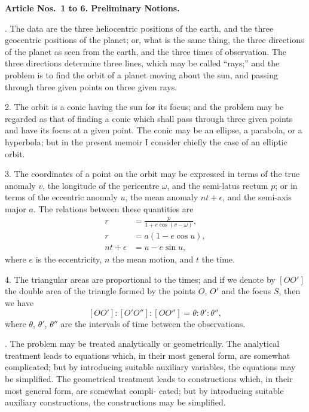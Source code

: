 \documentclass[11pt,a4paper]{article}
\theoremstyle{definition}
\begin{document}
\newpage
\noindent
\textbf{Article Nos.~1 to 6. Preliminary Notions.}

\smallskip

. The data are the three heliocentric positions of the earth, and the three geocentric
positions of the planet; or, what is the same thing, the three directions of the planet as
seen from the earth, and the three times of observation. The three directions determine
three lines, which may be called ``rays;'' and the problem is to find the orbit of a planet
moving about the sun, and passing through three given points on three given rays.

2. The orbit is a conic having the sun for its focus; and the problem may be regarded
as that of finding a conic which shall pass through three given points and have its focus
at a given point. The conic may be an ellipse, a parabola, or a hyperbola; but in the
present memoir I consider chiefly the case of an elliptic orbit.

3. The coordinates of a point on the orbit may be expressed in terms of the true
anomaly $v$, the longitude of the pericentre $\omega$, and the semi-latus rectum $p$; or in terms
of the eccentric anomaly $u$, the mean anomaly $nt+\epsilon$, and the semi-axis major $a$. The
relations between these quantities are
\begin{align*}
r &= \frac{p}{1+e\cos(v-\omega)}, \\
r &= a(1-e\cos u), \\
nt + \epsilon &= u - e\sin u,
\end{align*}
where $e$ is the eccentricity, $n$ the mean motion, and $t$ the time.

4. The triangular areas are proportional to the times; and if we denote by $[OO']$ the
double area of the triangle formed by the points $O$, $O'$ and the focus $S$, then we have
\[
[OO'] : [O'O''] : [OO''] = \theta : \theta' : \theta'',
\]
where $\theta$, $\theta'$, $\theta''$ are the intervals of time between the observations.

\newpage
{}. The problem may be treated analytically or geometrically. The analytical treatment
leads to equations which, in their most general form, are somewhat complicated; but by
introducing suitable auxiliary variables, the equations may be simplified. The geometrical
treatment leads to constructions which, in their most general form, are somewhat compli-
cated; but by introducing suitable auxiliary constructions, the constructions may be
simplified.
\end{document}
